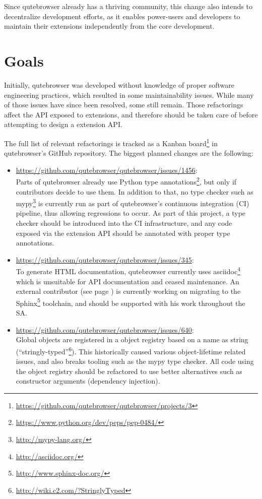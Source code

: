 \documentclass[a4paper,parskip=full]{scrreprt}
\begin{document}
Since qutebrowser already has a thriving community, this change also intends to
decentralize development efforts, as it enables power-users and
developers to maintain their extensions independently from the core development.

\section{Goals}
\label{goals}

Initially, qutebrowser was developed without knowledge of proper software
engineering practices, which resulted in some maintainability issues. While many
of those issues have since been resolved, some still remain. Those
refactorings affect the API exposed to extensions, and therefore should be taken
care of before attempting to design a extension API.

The full list of relevant refactorings is tracked as a Kanban
board\footnote{\url{https://github.com/qutebrowser/qutebrowser/projects/3}} in
qutebrowser's GitHub repository. The biggest planned changes are the following:

\begin{itemize}
  \item \url{https://github.com/qutebrowser/qutebrowser/issues/1456}: \\ Parts of qutebrowser already use Python type
    annotations\footnote{\url{https://www.python.org/dev/peps/pep-0484/}}, but
    only if contributors decide to use them. In addition to that, no type
    checker such as mypy\footnote{\url{http://mypy-lang.org/}} is currently run
    as part of qutebrowser's continuous integration (CI) pipeline, thus allowing
    regressions to occur. As part of this project, a type checker should be
    introduced into the CI infrastructure, and any code exposed via the extension
    API should be annotated with proper type annotations.
  \item \url{https://github.com/qutebrowser/qutebrowser/issues/345}: \\
    To generate HTML documentation, qutebrowser currently uses
    asciidoc\footnote{\url{http://asciidoc.org/}} which is unsuitable for API
    documentation and ceased maintenance. An external contributor (see page
    \pageref{fiete}) is currently working on migrating to the
    Sphinx\footnote{\url{http://www.sphinx-doc.org/}} toolchain, and should be
    supported with his work throughout the SA.
  \item \url{https://github.com/qutebrowser/qutebrowser/issues/640}: \\
    Global objects are registered in a object registry based on a name as
    string (``stringly-typed''\footnote{\url{http://wiki.c2.com/?StringlyTyped}}).
    This historically caused various object-lifetime related issues, and also
breaks tooling such as the mypy type checker. All code using the object registry
should be refactored to use better alternatives such as constructor arguments
(dependency injection).
\end{itemize}
\end{document}
